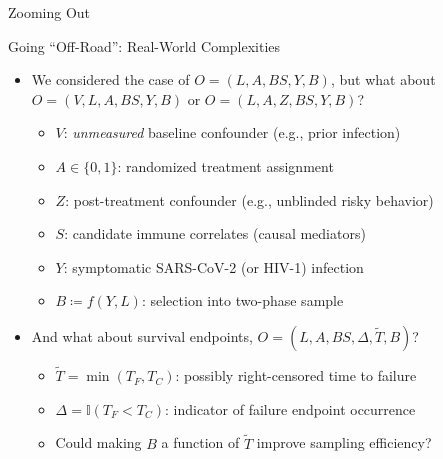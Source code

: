 \documentclass{beamer}
\begin{document}

\begin{frame}[standout]
  Zooming Out
\end{frame}


\begin{frame}[c]{Going ``Off-Road'': Real-World Complexities}

\begin{center}
\begin{itemize}
  \itemsep8pt
  \item We considered the case of $O = (L, A, BS, Y, B)$, but what about $O =
    (V, L, A, BS, Y, B)$ or $O = (L, A, Z, BS, Y, B)$?
    \begin{itemize}
      \item $V$: \textit{unmeasured} baseline confounder (e.g., prior
        infection)
      \item $A \in \{0, 1\}$: randomized treatment assignment
      \item $Z$: post-treatment confounder (e.g., unblinded risky
        behavior)
      \item $S$: candidate immune correlates (causal mediators)
      \item $Y$: symptomatic SARS-CoV-2 (or HIV-1) infection
      \item $B \coloneqq f(Y, L)$: selection into two-phase sample
    \end{itemize}
  \item And what about survival endpoints, $O = (L, A, BS, \Delta,
    \widetilde{T}, B)$?
    \begin{itemize}
      \item $\widetilde{T} = \min(T_F, T_C)$: possibly right-censored time
        to failure
      \item $\Delta = \mathbb{I}(T_F < T_C)$: indicator of failure
        endpoint occurrence
      \item Could making $B$ a function of $\widetilde{T}$ improve sampling
        efficiency?
    \end{itemize}
\end{itemize}
\end{center}


\end{frame}
\end{document}
